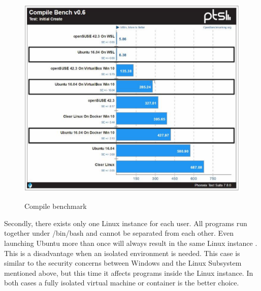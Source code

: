\documentclass[utf8,biblatex, ngerman, english]{lni}
\begin{document}
\begin{figure}
  \centering
  \includegraphics[width=1\textwidth]{CompileSpeed.pdf}
  \caption{Compile benchmark} \cite{La18} 
  \label{img:speed}
\end{figure}

Secondly, there exists only one Linux instance for each user. All programs run together under /bin/bash and cannot be separated from each other. Even launching Ubuntu more than once will always result in the same Linux instance \cite{Ha16b}. This is a disadvantage when an isolated environment is needed. This case is similar to the security concerns between Windows and the Linux Subsystem mentioned above, but this time it affects programs inside the Linux instance. In both cases a fully isolated virtual machine or container is the better choice.
\end{document}
